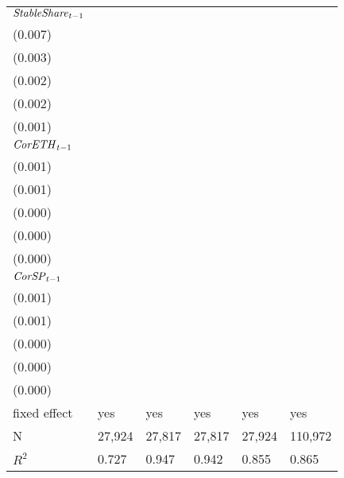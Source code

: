 \begin{tabular}{llllll}
${{\it StableShare}}_{t-1}$  &   \makecell{$0.091^{***}$ \\ (0.007)} &  \makecell{$-0.008^{***}$ \\ (0.003)} &  \makecell{$-0.007^{***}$ \\ (0.002)} &   \makecell{$0.023^{***}$ \\ (0.002)} &   \makecell{$0.013^{***}$ \\ (0.001)} \\
${{\it CorETH}}_{t-1}$       &  \makecell{$-0.005^{***}$ \\ (0.001)} &      \makecell{$0.001^{}$ \\ (0.001)} &      \makecell{$0.000^{}$ \\ (0.000)} &  \makecell{$-0.001^{***}$ \\ (0.000)} &  \makecell{$-0.000^{***}$ \\ (0.000)} \\
${{\it CorSP}}_{t-1}$        &     \makecell{$0.002^{*}$ \\ (0.001)} &     \makecell{$-0.001^{}$ \\ (0.001)} &     \makecell{$-0.000^{}$ \\ (0.000)} &   \makecell{$0.001^{***}$ \\ (0.000)} &   \makecell{$0.000^{***}$ \\ (0.000)} \\
\midrule fixed effect        &                                   yes &                                   yes &                                   yes &                                   yes &                                   yes \\
N                            &                                27,924 &                                27,817 &                                27,817 &                                27,924 &                               110,972 \\
$R^2$                        &                                 0.727 &                                 0.947 &                                 0.942 &                                 0.855 &                                 0.865 \\
\bottomrule
\end{tabular}
